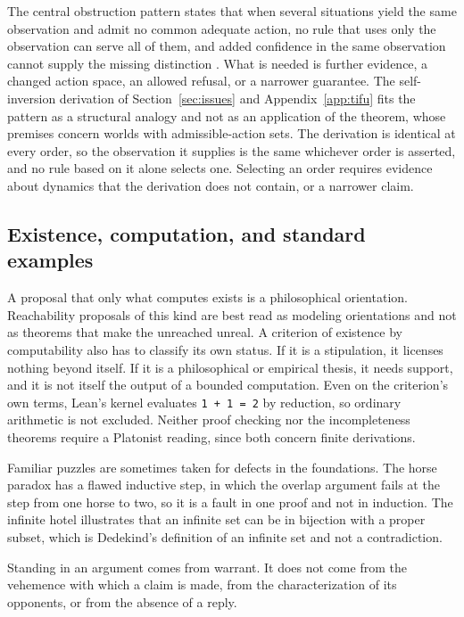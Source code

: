 \documentclass[11pt]{article}
\begin{document}
The central obstruction pattern states that when several situations yield the same observation and admit no common adequate action, no rule that uses only the observation can serve all of them, and added confidence in the same observation cannot supply the missing distinction \cite{flyxion2026ct}. What is needed is further evidence, a changed action space, an allowed refusal, or a narrower guarantee. The self-inversion derivation of Section~\ref{sec:issues} and Appendix~\ref{app:tifu} fits the pattern as a structural analogy and not as an application of the theorem, whose premises concern worlds with admissible-action sets. The derivation is identical at every order, so the observation it supplies is the same whichever order is asserted, and no rule based on it alone selects one. Selecting an order requires evidence about dynamics that the derivation does not contain, or a narrower claim.

\subsection{Existence, computation, and standard examples}

A proposal that only what computes exists is a philosophical orientation. Reachability proposals of this kind are best read as modeling orientations and not as theorems that make the unreached unreal. A criterion of existence by computability also has to classify its own status. If it is a stipulation, it licenses nothing beyond itself. If it is a philosophical or empirical thesis, it needs support, and it is not itself the output of a bounded computation. Even on the criterion's own terms, Lean's kernel evaluates \texttt{1 + 1 = 2} by reduction, so ordinary arithmetic is not excluded. Neither proof checking nor the incompleteness theorems require a Platonist reading, since both concern finite derivations.

Familiar puzzles are sometimes taken for defects in the foundations. The horse paradox has a flawed inductive step, in which the overlap argument fails at the step from one horse to two, so it is a fault in one proof and not in induction. The infinite hotel illustrates that an infinite set can be in bijection with a proper subset, which is Dedekind's definition of an infinite set and not a contradiction.

\medskip
Standing in an argument comes from warrant. It does not come from the vehemence with which a claim is made, from the characterization of its opponents, or from the absence of a reply.
\end{document}
